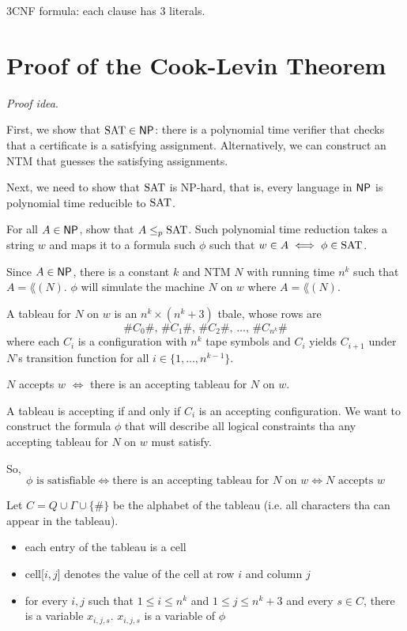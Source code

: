 3CNF formula: each clause has 3 literals.

\section{Proof of the Cook-Levin Theorem}

\textit{Proof idea}.

First, we show that $\mathrm{SAT} \in \mathsf{NP}$: there is a polynomial time verifier that checks that a certificate is a satisfying assignment. Alternatively, we can construct an NTM that guesses the satisfying assignments.

Next, we need to show that $\mathrm{SAT}$ is NP-hard, that is, every language in $\mathsf{NP}$ is polynomial time reducible to $\mathrm{SAT}$.

For all $A \in \mathsf{NP}$, show that $A \leq_p \mathrm{SAT}$. Such polynomial time reduction takes a string $w$ and maps it to a formula such $\phi$ such that $w \in A \iff \phi \in \mathrm{SAT}$.

Since $A \in \mathsf{NP}$, there is a constant $k$ and NTM $N$ with running time $n^k$ such that $A = \lang(N)$. $\phi$ will simulate the machine $N$ on $w$ where $A = \lang(N)$.

A tableau for $N$ on $w$ is an $n^k \times (n^k + 3)$ tbale, whose rows are
$$
\# C_0 \#,\,\# C_1 \#,\, \# C_2 \#,\, \ldots,\, \# C_{n^k} \#
$$
where each $C_i$ is a configuration with $n^k$ tape symbols and $C_i$ yields $C_{i+1}$ under $N$'s transition function for all $i \in \{1,\ldots,n^{k-1}\}$.

$N$ accepts $w$ $\iff$ there is an accepting tableau for $N$ on $w$.

A tableau is accepting if and only if $C_i$ is an accepting configuration. We want to construct the formula $\phi$ that will describe all logical constraints tha any accepting tableau for $N$ on $w$ must satisfy.

So,
$$
\text{$\phi$ is satisfiable} \iff \text{there is an accepting tableau for $N$ on $w$} \iff \text{$N$ accepts $w$} 
$$

Let $C = Q \cup \Gamma \cup \{\#\}$ be the alphabet of the tableau (i.e. all characters tha can appear in the tableau).

\begin{itemize}
    \item each entry of the tableau is a cell
    \item cell[$i,j$] denotes the value of the cell at row $i$ and column $j$ 
    \item for every $i,j$ such that $1 \leq i \leq n^k$ and $1 \leq j \leq n^k + 3$ and every $s \in C$, there is a variable $x_{i,j,s}$. $x_{i,j,s}$ is a variable of $\phi$
\end{itemize}

